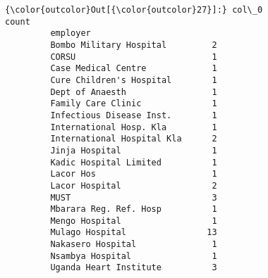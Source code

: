 \documentclass[11pt]{article}
\begin{document}
\begin{Verbatim}[commandchars=\\\{\}]
{\color{outcolor}Out[{\color{outcolor}27}]:} col\_0                       count
         employer                         
         Bombo Military Hospital         2
         CORSU                           1
         Case Medical Centre             1
         Cure Children's Hospital        1
         Dept of Anaesth                 1
         Family Care Clinic              1
         Infectious Disease Inst.        1
         International Hosp. Kla         1
         International Hospital Kla      2
         Jinja Hospital                  1
         Kadic Hospital Limited          1
         Lacor Hos                       1
         Lacor Hospital                  2
         MUST                            3
         Mbarara Reg. Ref. Hosp          1
         Mengo Hospital                  1
         Mulago Hospital                13
         Nakasero Hospital               1
         Nsambya Hospital                1
         Uganda Heart Institute          3
\end{Verbatim}
            
\end{document}
